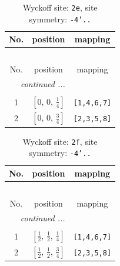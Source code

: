 \documentclass[fleqn,8pt]{jsarticle}
\begin{document}
\begin{longtable}{ccc}
\caption{Wyckoff site: {\tt 2e}, site symmetry: {\tt -4'..}}
 \\
 \hline \hline
No. & position & mapping \\ \hline \endfirsthead

\multicolumn{2}{l}{\tablename\ \thetable{}} \\
 \hline \hline
No. & position & mapping \\ \hline \endhead

 \hline \hline
\multicolumn{2}{r}{\footnotesize\it continued ...} \\ \endfoot

 \hline \hline
\multicolumn{2}{r}{} \\ \endlastfoot

1 & $\left[ 0,\, 0,\, \frac{1}{4} \right]$ & {\tt [1,4,6,7]} \\ \hline
2 & $\left[ 0,\, 0,\, \frac{3}{4} \right]$ & {\tt [2,3,5,8]} \\
\end{longtable}
\renewcommand{\arraystretch}{1.2}
\begin{longtable}{ccc}
\caption{Wyckoff site: {\tt 2f}, site symmetry: {\tt -4'..}}
 \\
 \hline \hline
No. & position & mapping \\ \hline \endfirsthead

\multicolumn{2}{l}{\tablename\ \thetable{}} \\
 \hline \hline
No. & position & mapping \\ \hline \endhead

 \hline \hline
\multicolumn{2}{r}{\footnotesize\it continued ...} \\ \endfoot

 \hline \hline
\multicolumn{2}{r}{} \\ \endlastfoot

1 & $\left[ \frac{1}{2},\, \frac{1}{2},\, \frac{1}{4} \right]$ & {\tt [1,4,6,7]} \\ \hline
2 & $\left[ \frac{1}{2},\, \frac{1}{2},\, \frac{3}{4} \right]$ & {\tt [2,3,5,8]} \\
\end{longtable}
\renewcommand{\arraystretch}{1.2}
\end{document}
